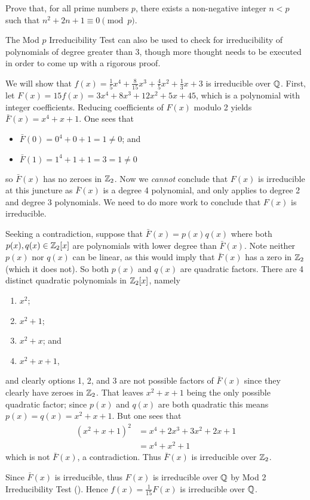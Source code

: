 \begin{exercise}
    Prove that, for all prime numbers $p$, there exists a non-negative integer $n < p$ such that $n^2 + 2n + 1 \equiv 0 \pmod{p}$.
\end{exercise}

The Mod $p$ Irreducibility Test can also be used to check for irreducibility of polynomials of degree greater than 3, though more thought needs to be executed in order to come up with a rigorous proof.

\begin{example}\label{example-x^4+x+1-is-irreducible-over-Z2}
    We will show that $f(x) = \frac15x^4 + \frac8{15}x^3 + \frac45x^2 + \frac13x + 3$ is irreducible over $\mathbb{Q}$. First, let $F(x) = 15f(x) = 3x^4 + 8x^3 + 12x^2 + 5x + 45$, which is a polynomial with integer coefficients. Reducing coefficients of $F(x)$ modulo 2 yields $\bar{F}(x) = x^4 + x + 1$. One sees that
    \begin{itemize}
        \item $\bar{F}(0) = 0^4 + 0 + 1 = 1 \neq 0$; and
        \item $\bar{F}(1) = 1^4 + 1 + 1 = 3 = 1 \neq 0$
    \end{itemize}
    so $\bar{F}(x)$ has no zeroes in $\mathbb{Z}_2$. Now we \textit{cannot} conclude that $F(x)$ is irreducible at this juncture as $\bar{F}(x)$ is a degree 4 polynomial, and  only applies to degree 2 and degree 3 polynomials. We need to do more work to conclude that $F(x)$ is irreducible.

    Seeking a contradiction, suppose that $\bar{F}(x) = p(x)q(x)$ where both $p(x), q(x) \in \mathbb{Z}_2[x]$ are polynomials with lower degree than $\bar{F}(x)$. Note neither $p(x)$ nor $q(x)$ can be linear, as this would imply that $\bar{F}(x)$ has a zero in $\mathbb{Z}_2$ (which it does not). So both $p(x)$ and $q(x)$ are quadratic factors. There are 4 distinct quadratic polynomials in $\mathbb{Z}_2[x]$, namely
    \begin{enumerate}
        \item $x^2$;
        \item $x^2 + 1$;
        \item $x^2 + x$; and
        \item $x^2 + x + 1$,
    \end{enumerate}
    and clearly options 1, 2, and 3 are not possible factors of $\bar{F}(x)$ since they clearly have zeroes in $\mathbb{Z}_2$. That leaves $x^2 + x + 1$ being the only possible quadratic factor; since $p(x)$ and $q(x)$ are both quadratic this means $p(x) = q(x) = x^2 + x + 1$. But one sees that
    \begin{align*}
        (x^2 + x + 1)^2 &= x^4 + 2x^3 + 3x^2 + 2x + 1\\
        &= x^4 + x^2 + 1
    \end{align*}
    which is not $\bar{F}(x)$, a contradiction. Thus $\bar{F}(x)$ is irreducible over $\mathbb{Z}_2$.

    Since $\bar{F}(x)$ is irreducible, thus $F(x)$ is irreducible over $\mathbb{Q}$ by Mod 2 Irreducibility Test (). Hence $f(x) = \frac1{15} F(x)$ is irreducible over $\mathbb{Q}$.
\end{example}

